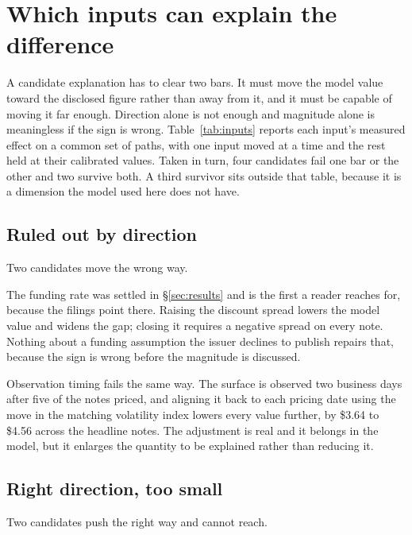 \section{Which inputs can explain the difference}\label{sec:inputs}



A candidate explanation has to clear two bars. It must move the model value
toward the disclosed figure rather than away from it, and it must be capable of
moving it far enough. Direction alone is not enough and magnitude alone is
meaningless if the sign is wrong. Table~\ref{tab:inputs} reports each input's
measured effect on a common set of paths, with one input moved at a time and
the rest held at their calibrated values. Taken in turn, four candidates fail
one bar or the other and two survive both. A third survivor sits outside that
table, because it is a dimension the model used here does not have.

\subsection{Ruled out by direction}

Two candidates move the wrong way.

The funding rate was settled in \S\ref{sec:results} and is the first a reader
reaches for, because the filings point there. Raising the discount spread
lowers the model value and widens the gap; closing it requires a negative
spread on every note. Nothing about a funding assumption the issuer declines to
publish repairs that, because the sign is wrong before the magnitude is
discussed.

Observation timing fails the same way. The surface is observed two business
days after five of the notes priced, and aligning it back to each pricing date
using the move in the matching volatility index lowers every value further, by
\$3.64 to \$4.56 across the headline notes. The adjustment is real and it
belongs in the model, but it enlarges the quantity to be explained rather than
reducing it.

\subsection{Right direction, too small}

Two candidates push the right way and cannot reach.

